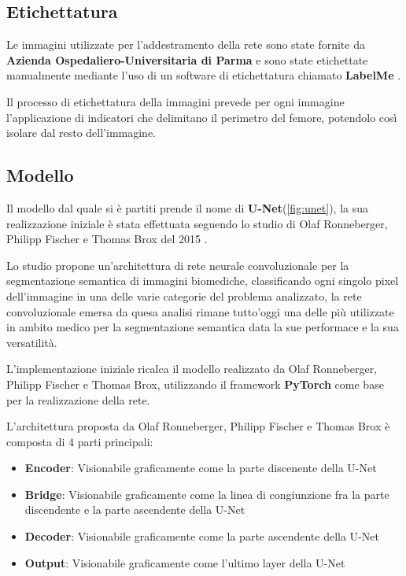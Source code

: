 \subsection{Etichettatura}
Le immagini utilizzate per l'addestramento della rete sono state fornite da \textbf{Azienda Ospedaliero-Universitaria di Parma} e sono state etichettate manualmente mediante
l'uso di un software di etichettatura chiamato \textbf{LabelMe} \cite{labelme}.

Il processo di etichettatura della immagini prevede per ogni immagine l'applicazione di indicatori che delimitano il perimetro del femore, potendolo così isolare dal resto dell'immagine.


\subsection{Modello}

Il modello dal quale si è partiti prende il nome di \textbf{U-Net}(\autoref{fig:unet}), la sua realizzazione iniziale è stata effettuata seguendo lo studio di Olaf Ronneberger, Philipp Fischer e Thomas Brox del 2015 \cite{ronneberger2015unet}.

Lo studio propone un'architettura di rete neurale convoluzionale per la segmentazione semantica di immagini biomediche, classificando ogni singolo pixel dell'immagine in una delle varie categorie del problema analizzato, la rete convoluzionale emersa da quesa analisi rimane tutto'oggi una delle più utilizzate in ambito medico per la segmentazione semantica data la sue performace e la sua versatilità.

L'implementazione iniziale ricalca il modello realizzato da Olaf Ronneberger, Philipp Fischer e Thomas Brox, utilizzando il framework \textbf{PyTorch} \cite{pytorch} come base per la realizzazione della rete.

L'architettura proposta da Olaf Ronneberger, Philipp Fischer e Thomas Brox è composta di 4 parti principali:
\begin{itemize}
  \item \textbf{Encoder}: Visionabile graficamente come la parte discenente della U-Net
  \item \textbf{Bridge}: Visionabile graficamente come la linea di congiunzione fra la parte discendente e la parte ascendente della U-Net
  \item \textbf{Decoder}: Visionabile graficamente come la parte ascendente della U-Net
  \item \textbf{Output}: Visionabile graficamente come l'ultimo layer della U-Net
\end{itemize}

